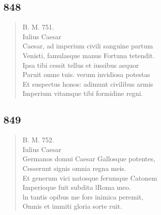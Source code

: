 \documentclass[11pt, a4paper]{report}
\begin{document}
            \subsection*{848}
      \begin{verse}
      B. M. 751. \\  \lbrack Iulius Caesar \\ Caesar, ad imperium civili sanguine partum \\ Venisti, famulasque manus Fortuna tetendit. \\ Ipsa tibi cessit tellus et iussibus aequor \\ Paruit omne tuis. verum invidiosa potestas \\ Et suspectus honos: adimunt civilibus armis \\ Imperium vitamque tibi formidine regni. \\ 
      \end{verse}
  
            \subsection*{849}
      \begin{verse}
      B. M. 752. \\ Iulius Caesar \\ Germanos domui Caesar Gallosque potentes, \\ Cesserunt signis omnia regna meis. \\ Et generum vici natosque ferumque Catonem \\ Imperioque fuit subdita lRoma meo. \\ ln tantis opibus me fors inimica peremit, \\ Omnis et immiti gloria sorte ruit. \\ 
      \end{verse}
  
\end{document}
